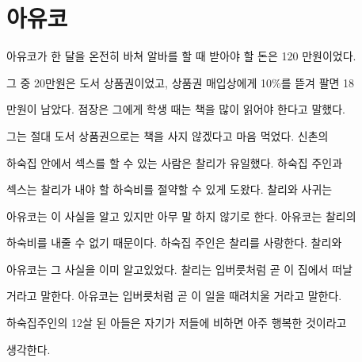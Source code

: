 \hypertarget{uxc544uxc720uxcf54}{%

\section{아유코}\label{uxc544uxc720uxcf54}}



아유코가 한 달을 온전히 바쳐 알바를 할 때 받아야 할 돈은 120 만원이었다.

그 중 20만원은 도서 상품권이었고, 상품권 매입상에게 10\%를 뜯겨 팔면 18

만원이 남았다. 점장은 그에게 학생 때는 책을 많이 읽어야 한다고 말했다.

그는 절대 도서 상품권으로는 책을 사지 않겠다고 마음 먹었다. 신촌의

하숙집 안에서 섹스를 할 수 있는 사람은 찰리가 유일했다. 하숙집 주인과

섹스는 찰리가 내야 할 하숙비를 절약할 수 있게 도왔다. 찰리와 사귀는

아유코는 이 사실을 알고 있지만 아무 말 하지 않기로 한다. 아유코는 찰리의

하숙비를 내줄 수 없기 때문이다. 하숙집 주인은 찰리를 사랑한다. 찰리와

아유코는 그 사실을 이미 알고있었다. 찰리는 입버릇처럼 곧 이 집에서 떠날

거라고 말한다. 아유코는 입버릇처럼 곧 이 일을 때려치울 거라고 말한다.

하숙집주인의 12살 된 아들은 자기가 저들에 비하면 아주 행복한 것이라고

생각한다.

